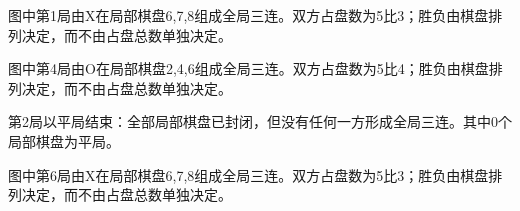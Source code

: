 图中第1局由X在局部棋盘6,7,8组成全局三连。双方占盘数为5比3；胜负由棋盘排列决定，而不由占盘总数单独决定。

图中第4局由O在局部棋盘2,4,6组成全局三连。双方占盘数为5比4；胜负由棋盘排列决定，而不由占盘总数单独决定。

第2局以平局结束：全部局部棋盘已封闭，但没有任何一方形成全局三连。其中0个局部棋盘为平局。

图中第6局由X在局部棋盘6,7,8组成全局三连。双方占盘数为5比3；胜负由棋盘排列决定，而不由占盘总数单独决定。
